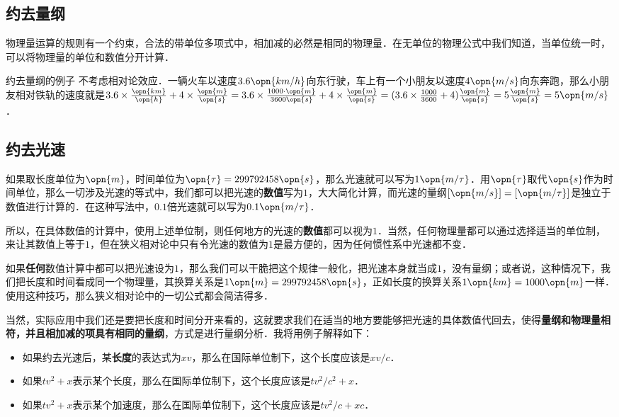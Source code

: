 
\subsection{约去量纲}

物理量运算的规则有一个约束，合法的带单位多项式中，相加减的必然是相同的物理量．在无单位的物理公式中我们知道，当单位统一时，可以将物理量的单位和数值分开计算．

\begin{example}{约去量纲的例子}
不考虑相对论效应．一辆火车以速度$3.6\opn{km/h}$向东行驶，车上有一个小朋友以速度$4\opn{m/s}$向东奔跑，那么小朋友相对铁轨的速度就是$3.6\times\frac{\opn{km}}{\opn{h}}+4\times\frac{\opn{m}}{\opn{s}}=3.6\times\frac{1000\cdot \opn{m}}{3600\opn{s}}+4\times\frac{\opn{m}}{\opn{s}}=(3.6\times\frac{1000}{3600}+4)\frac{\opn{m}}{\opn{s}}=5\frac{\opn{m}}{\opn{s}}=5\opn{m/s}$．
\end{example}

\subsection{约去光速}

如果取长度单位为$\opn{m}$，时间单位为$\opn{\tau}=299792458\opn{s}$，那么光速就可以写为$1\opn{m/\tau}$．用$\opn{\tau}$取代$\opn{s}$作为时间单位，那么一切涉及光速的等式中，我们都可以把光速的\textbf{数值}写为$1$，大大简化计算，而光速的量纲$[\opn{m/s}]=[\opn{m/\tau}]$是独立于数值进行计算的．在这种写法中，$0.1$倍光速就可以写为$0.1\opn{m/\tau}$．

所以，在具体数值的计算中，使用上述单位制，则任何地方的光速的\textbf{数值}都可以视为$1$．当然，任何物理量都可以通过选择适当的单位制，来让其数值上等于$1$，但在狭义相对论中只有令光速的数值为$1$是最方便的，因为任何惯性系中光速都不变．

如果\textbf{任何}数值计算中都可以把光速设为$1$，那么我们可以干脆把这个规律一般化，把光速本身就当成$1$，没有量纲；或者说，这种情况下，我们把长度和时间看成同一个物理量，其换算关系是$1\opn{m}=299792458\opn{s}$，正如长度的换算关系$1\opn{km}=1000\opn{m}$一样．使用这种技巧，那么狭义相对论中的一切公式都会简洁得多．

当然，实际应用中我们还是要把长度和时间分开来看的，这就要求我们在适当的地方要能够把光速的具体数值代回去，使得\textbf{量纲和物理量相符，并且相加减的项具有相同的量纲}，方式是进行量纲分析．我将用例子解释如下：

\begin{example}{}
\begin{itemize}
\item 如果约去光速后，某\textbf{长度}的表达式为$xv$，那么在国际单位制下，这个长度应该是$xv/c$．
\item 如果$tv^2+x$表示某个长度，那么在国际单位制下，这个长度应该是$tv^2/c^2+x$．
\item 如果$tv^2+x$表示某个加速度，那么在国际单位制下，这个长度应该是$tv^2/c+xc$．

\end{itemize}
\end{example}

